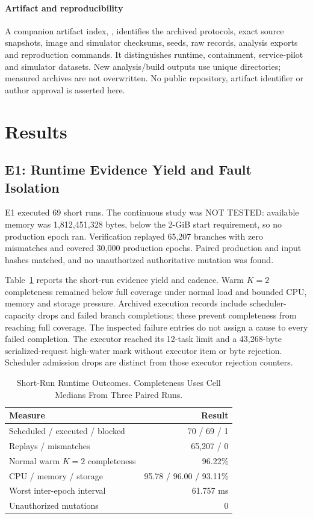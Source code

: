 \documentclass[conference,letterpaper]{IEEEtran}
\begin{document}
\paragraph{Artifact and reproducibility}
A companion artifact index, , identifies the archived
protocols, exact source snapshots, image and simulator checksums, seeds, raw
records, analysis exports and reproduction commands. It distinguishes runtime,
containment, service-pilot and simulator datasets. New analysis/build outputs
use unique directories; measured archives are not overwritten. No public
repository, artifact identifier or author approval is asserted here.

\section{Results}
\subsection{E1: Runtime Evidence Yield and Fault Isolation}
E1 executed 69 short runs. The continuous study was NOT TESTED: available memory
was 1,812,451,328 bytes, below the 2-GiB start requirement, so no production
epoch ran. Verification replayed 65,207 branches with zero mismatches and covered
30,000 production epochs. Paired production and input hashes matched, and no
unauthorized authoritative mutation was found.

Table~\ref{tab:runtime} reports the short-run evidence yield and cadence.
Warm $K=2$ completeness remained below full coverage under normal load and
bounded CPU, memory and storage pressure.
Archived execution records include scheduler-capacity drops and failed branch
completions; these prevent completeness from reaching full coverage. The
inspected failure entries do not assign a cause to every failed completion.
The executor reached its 12-task limit and a 43,268-byte serialized-request
high-water mark without executor item or byte rejection. Scheduler admission
drops are distinct from those executor rejection counters.

\begin{table}[t]
\caption{Short-Run Runtime Outcomes. Completeness Uses Cell Medians From Three Paired Runs.}
\label{tab:runtime}
\centering
\begin{tabular}{lr}
\toprule
Measure & Result \\
\midrule
Scheduled / executed / blocked & 70 / 69 / 1 \\
Replays / mismatches & 65,207 / 0 \\
Normal warm $K=2$ completeness & 96.22\% \\
CPU / memory / storage & 95.78 / 96.00 / 93.11\% \\
Worst inter-epoch interval & 61.757 ms \\
Unauthorized mutations & 0 \\
\bottomrule
\end{tabular}
\end{table}
\end{document}
